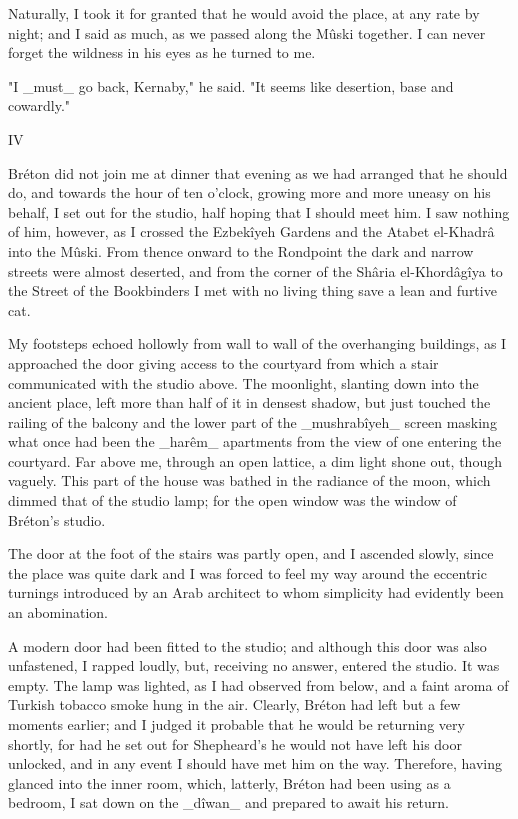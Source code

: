 Naturally, I took it for granted that he would avoid the place, at any
rate by night; and I said as much, as we passed along the Mûski
together. I can never forget the wildness in his eyes as he turned to
me.

"I _must_ go back, Kernaby," he said. "It seems like desertion, base
and cowardly."


IV

Bréton did not join me at dinner that evening as we had arranged that
he should do, and towards the hour of ten o'clock, growing more and
more uneasy on his behalf, I set out for the studio, half hoping that
I should meet him. I saw nothing of him, however, as I crossed the
Ezbekîyeh Gardens and the Atabet el-Khadrâ into the Mûski. From thence
onward to the Rondpoint the dark and narrow streets were almost
deserted, and from the corner of the Shâria el-Khordâgîya to the
Street of the Bookbinders I met with no living thing save a lean and
furtive cat.

My footsteps echoed hollowly from wall to wall of the overhanging
buildings, as I approached the door giving access to the courtyard
from which a stair communicated with the studio above. The moonlight,
slanting down into the ancient place, left more than half of it in
densest shadow, but just touched the railing of the balcony and the
lower part of the _mushrabîyeh_ screen masking what once had been the
_harêm_ apartments from the view of one entering the courtyard. Far
above me, through an open lattice, a dim light shone out, though
vaguely. This part of the house was bathed in the radiance of the
moon, which dimmed that of the studio lamp; for the open window was
the window of Bréton's studio.

The door at the foot of the stairs was partly open, and I ascended
slowly, since the place was quite dark and I was forced to feel my way
around the eccentric turnings introduced by an Arab architect to whom
simplicity had evidently been an abomination.

A modern door had been fitted to the studio; and although this door
was also unfastened, I rapped loudly, but, receiving no answer,
entered the studio. It was empty. The lamp was lighted, as I had
observed from below, and a faint aroma of Turkish tobacco smoke hung
in the air. Clearly, Bréton had left but a few moments earlier; and
I judged it probable that he would be returning very shortly, for had
he set out for Shepheard's he would not have left his door unlocked,
and in any event I should have met him on the way. Therefore, having
glanced into the inner room, which, latterly, Bréton had been using as
a bedroom, I sat down on the _dîwan_ and prepared to await his return.

